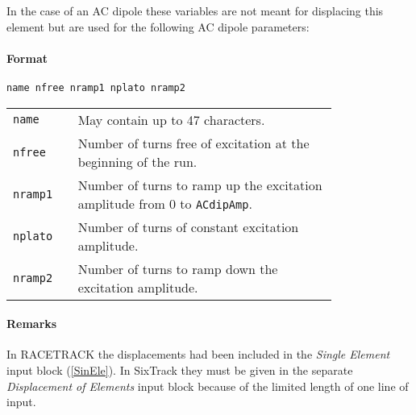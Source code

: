\bigskip
\noindent In the case of an AC dipole these variables are not meant for displacing this element but are used for the following AC dipole parameters:

\paragraph{Format} \texttt{name nfree nramp1 nplato nramp2}

\bigskip
\begin{tabular}{@{}lp{0.80\linewidth}}
    \texttt{name}   & May contain up to 47 characters. \\
    \texttt{nfree}  & Number of turns free of excitation at the beginning of the run. \\
    \texttt{nramp1} & Number of turns to ramp up the excitation amplitude from 0 to \texttt{ACdipAmp}. \\
    \texttt{nplato} & Number of turns of constant excitation amplitude. \\
    \texttt{nramp2} & Number of turns to ramp down the excitation amplitude.
\end{tabular}

\paragraph{Remarks}
In RACETRACK the displacements had been included in the \textit{Single Element} input block (\ref{SinEle}).
In SixTrack they must be given in the separate \textit{Displacement of Elements} input block because of the limited length of one line of input.

